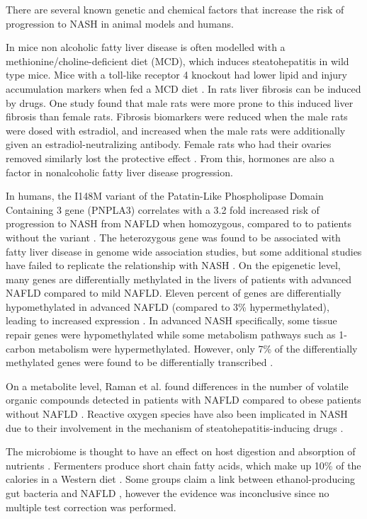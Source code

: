 There are several known genetic and chemical factors that increase the risk of progression to NASH in animal models and humans.

In mice non alcoholic fatty liver disease is often modelled with a methionine/choline-deficient diet (MCD), which induces steatohepatitis in wild type mice. Mice with a toll-like receptor 4 knockout had lower lipid and injury accumulation markers when fed a MCD diet \cite{rivera2007toll}. In rats liver fibrosis can be induced by drugs. One study found that male rats were more prone to this induced liver fibrosis than female rats. Fibrosis biomarkers were reduced when the male rats were dosed with estradiol, and increased when the male rats were additionally given an estradiol-neutralizing antibody. Female rats who had their ovaries removed similarly lost the protective effect \cite{yasuda1999suppressive}. From this, hormones are also a factor in nonalcoholic fatty liver disease progression.

In humans, the I148M variant of the Patatin-Like Phospholipase Domain Containing 3 gene (PNPLA3) correlates with a 3.2 fold increased risk of progression to NASH from NAFLD when homozygous, compared to to patients without the variant \cite{sookoian2011meta}. The heterozygous gene was found to be associated with fatty liver disease in genome wide association studies, but some additional studies have failed to replicate the relationship with NASH \cite{sookoian2011meta}. On the epigenetic level, many genes are differentially methylated in the livers of patients with advanced NAFLD compared to mild NAFLD. Eleven percent of genes are differentially hypomethylated in advanced NAFLD (compared to 3\% hypermethylated), leading to increased expression \cite{murphy2013relationship}. In advanced NASH specifically, some tissue repair genes were hypomethylated while some metabolism pathways such as 1-carbon metabolism were hypermethylated. However, only 7\% of the differentially methylated genes were found to be differentially transcribed \cite{murphy2013relationship}.

On a metabolite level, Raman et al. found differences in the number of volatile organic compounds detected in patients with NAFLD compared to obese patients without NAFLD \cite{raman2013fecal}. Reactive oxygen species have also been implicated in NASH due to their involvement in the mechanism of steatohepatitis-inducing drugs \cite{berson1998steatohepatitis}.

The microbiome is thought to have an effect on host digestion and absorption of nutrients \cite{gill2006metagenomic}. Fermenters produce short chain fatty acids, which make up 10\% of the calories in a Western diet \cite{mcneil1984contribution}. Some groups claim a link between ethanol-producing gut bacteria and NAFLD \cite{zhu2013characterization} \cite{jiang2015dysbiosis}, however the evidence was inconclusive since no multiple test correction was performed.


